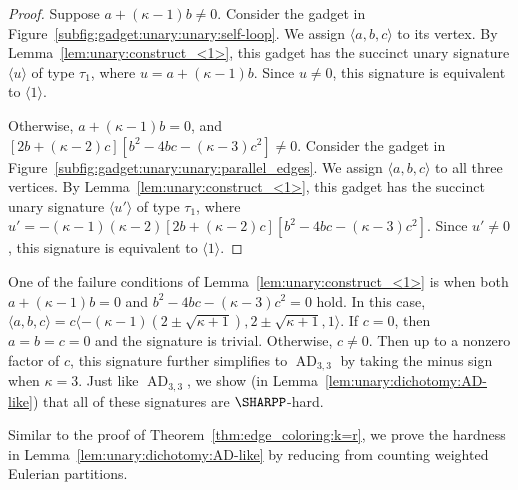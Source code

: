 \documentclass[11pt]{article}
\newcommand{\AD}{\operatorname{AD}}
\begin{document}
\begin{proof}
 Suppose $a + (\kappa - 1) b \ne 0$.
 Consider the gadget in Figure~\ref{subfig:gadget:unary:unary:self-loop}.
 We assign $\langle a,b,c \rangle$ to its vertex.
 By Lemma~\ref{lem:unary:construct_<1>},
 this gadget has the succinct unary signature $\langle u \rangle$ of type $\tau_1$,
 where $u = a + (\kappa - 1) b$.
 Since $u \ne 0$,
 this signature is equivalent to $\langle 1 \rangle$.
 
 Otherwise, $a + (\kappa - 1) b = 0$,
 and $[2 b + (\kappa - 2) c] [b^2 - 4 b c - (\kappa - 3) c^2] \ne 0$.
 Consider the gadget in Figure~\ref{subfig:gadget:unary:unary:parallel_edges}.
 We assign $\langle a,b,c \rangle$ to all three vertices.
 By Lemma~\ref{lem:unary:construct_<1>},
 this gadget has the succinct unary signature $\langle u' \rangle$ of type $\tau_1$,
 where $u' = -(\kappa - 1) (\kappa - 2) [2 b + (\kappa - 2) c] [b^2 - 4 b c - (\kappa - 3) c^2]$.
 Since $u' \ne 0$,
 this signature is equivalent to $\langle 1 \rangle$.
\end{proof}

One of the failure conditions of Lemma~\ref{lem:unary:construct_<1>} is when both $a + (\kappa - 1) b = 0$ and $b^2 - 4 b c - (\kappa - 3) c^2 = 0$ hold.
In this case, $\langle a,b,c \rangle = c \langle -(\kappa - 1) (2 \pm \sqrt{\kappa + 1}), 2 \pm \sqrt{\kappa + 1}, 1 \rangle$.
If $c = 0$,
then $a = b = c = 0$ and the signature is trivial.
Otherwise, $c \ne 0$.
Then up to a nonzero factor of $c$,
this signature further simplifies to $\AD_{3,3}$ by taking the minus sign when $\kappa = 3$.
Just like $\AD_{3,3}$,
we show (in Lemma~\ref{lem:unary:dichotomy:AD-like}) that all of these signatures are $\SHARPP$-hard.

Similar to the proof of Theorem~\ref{thm:edge_coloring:k=r},
we prove the hardness in Lemma~\ref{lem:unary:dichotomy:AD-like} by reducing from counting weighted Eulerian partitions.
\end{document}
